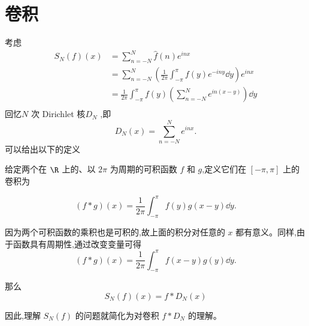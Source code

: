 \section{卷积}
考虑\[
\begin{aligned}
	S_N(f)(x)
	&=\sum_{n=-N}^{N}\widehat f(n)e^{inx} \\
	&=\sum_{n=-N}^{N}\left(\frac1{2\pi}\int_{-\pi}^{\pi}f(y)e^{-iny}\dd y\right)e^{inx} \\
	&=\frac1{2\pi}\int_{-\pi}^{\pi}f(y)\left(\sum_{n=-N}^{N}e^{in(x-y)}\right)\dd y \\
\end{aligned}
\]
回忆$N$ 次 Dirichlet 核$D_N$ ,即
\[
D_N(x)=\sum_{n=-N}^{N}e^{inx}.
\]
可以给出以下的定义
\begin{definition}
	
给定两个在 $\R$ 上的、以 $2\pi$ 为周期的可积函数 $f$ 和 $g$,定义它们在 $[-\pi,\pi]$ 上的卷积为

	\[(f\ast g)(x)=\frac1{2\pi}\int_{-\pi}^{\pi}f(y)g(x-y)\dd y .\]

\end{definition}
因为两个可积函数的乘积也是可积的,故上面的积分对任意的 $x$ 都有意义。同样,由于函数具有周期性,通过改变变量可得
\[
(f\ast g)(x)=\frac1{2\pi}\int_{-\pi}^{\pi}f(x-y)g(y)\dd y .
\]

那么\[S_N(f)(x)=f\ast D_N(x)\]

因此,理解 $S_N(f)$ 的问题就简化为对卷积 $f\ast D_N$ 的理解。

